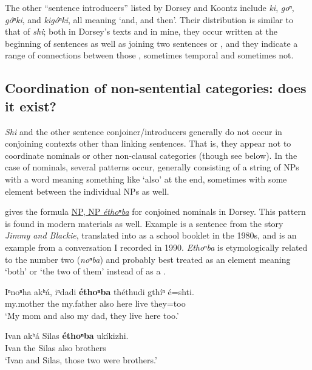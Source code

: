 \documentclass[output=paper]{LSP/langsci}
\begin{document}
The other ``sentence introducers'' listed by Dorsey and Koontz include \textit{ki}, \textit{goⁿ}, \textit{góⁿki}, and \textit{kigóⁿki}, all meaning `and, and then'. Their distribution is similar to that of \textit{shi}; both in Dorsey's texts and in mine, they occur written at the beginning of sentences as well as joining two sentences or , and they indicate a range of connections between those , sometimes temporal and sometimes not. 

\subsection{Coordination of non-sentential categories: does it exist?}

\textit{Shi} and the other sentence conjoiner/introducers generally do not occur in conjoining contexts other than linking sentences. That is, they appear not to coordinate nominals or other non-clausal categories (though see  below).  In the case of nominals, several patterns occur, generally consisting of a string of NPs with a word meaning something like `also' at the end, sometimes with some element between the individual NPs as well.  

\citet[201]{Koontz1984} gives the formula \uline{NP, NP \textit{éthoⁿba}} for conjoined nominals in Dorsey.  This pattern is found in modern materials as well.  Example  is a sentence from the story \textit{Jimmy and Blackie}, translated into  as a school booklet in the 1980s, and  is an example from a conversation I recorded in 1990. \textit{Ethoⁿba} is etymologically related to the number two (\textit{noⁿba}) and probably best treated as an element meaning `both' or `the two of them' instead of as a .

\begin{exe}
\ex\label{ex:rudin:12} 
\gll  Iⁿnoⁿha  	akʰá, iⁿdadi    \textbf{éthoⁿba} 	théthudi 	gthíⁿ 	é=shti.  \\
	my.mother 	the  	my.father 	also        	here       	live   	they=too\\
\trans `My mom and also my dad, they live here too.'

\ex\label{ex:rudin:13} 
\gll  Ivan 	akʰá Silas 	\textbf{éthoⁿba} ukíkizhi. \\         
Ivan the   Silas	 also       	brothers\\
\trans`Ivan and Silas, those two were brothers.'
\end{exe}
\end{document}
